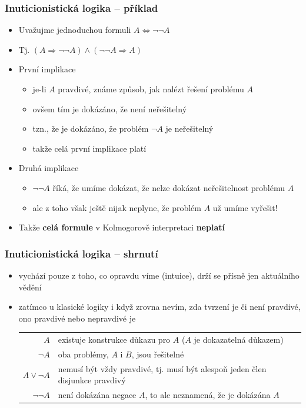 \documentclass[aspectratio=169]{beamer}
\begin{document}
\begin{frame}
\frametitle{Inuticionistická logika -- příklad}
\begin{itemize}
\item Uvažujme jednoduchou formuli $A \Leftrightarrow \neg \neg A$
\item Tj. $(A \Rightarrow \neg \neg A) \land (\neg \neg A \Rightarrow A)$
\item První implikace
    \begin{itemize}
    \item je-li $A$ pravdivé, známe způsob, jak nalézt řešení problému $A$
    \item ovšem tím je dokázáno, že není neřešitelný
    \item tzn., že je dokázáno, že problém $\neg A$ je neřešitelný
    \item takže celá první implikace platí
    \end{itemize}
\item Druhá implikace
    \begin{itemize}
    \item $\neg \neg A$ říká, že umíme dokázat, že nelze dokázat neřešitelnost problému $A$
    \item ale z toho však ještě nijak neplyne, že problém $A$ už umíme vyřešit!
    \end{itemize}
\item Takže \textbf{celá formule} v Kolmogorově interpretaci \textbf{neplatí}
\end{itemize}
\end{frame}




\begin{frame}
\frametitle{Inuticionistická logika -- shrnutí}
\begin{itemize}
\item vychází pouze z toho, co opravdu víme (intuice), drží se přísně jen aktuálního vědění
\item zatímco u klasické logiky i když zrovna nevím, zda tvrzení je či není pravdivé, ono pravdivé nebo nepravdivé je

\begin{table}
\begin{tabular}{ r l }
$A$ & existuje konstrukce důkazu pro $A$ ($A$ je dokazatelná důkazem) \\ 
$\neg A$ & oba problémy, $A$ i $B$, jsou řešitelné \\
$A \lor \neg A$ & nemusí být vždy pravdivé, tj. musí být alespoň jeden člen disjunkce pravdivý \\
$\neg \neg A$ & není dokázána negace $A$, to ale neznamená, že je dokázána $A$ \\
\end{tabular}
\end{table}
\end{itemize}
\end{frame}
\end{document}
